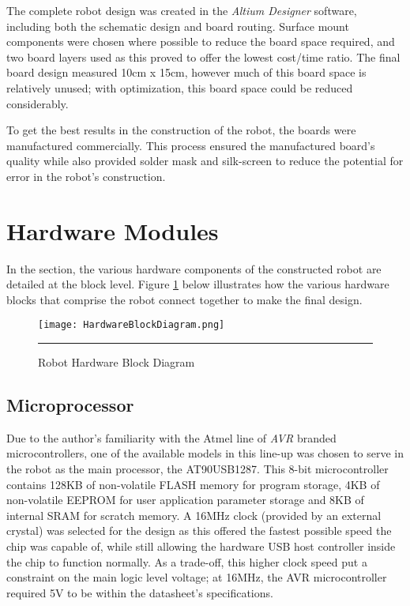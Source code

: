 The complete robot design was created in the \textit{Altium Designer} software, including both the schematic design and board routing. Surface mount components were chosen where possible to reduce the board space required, and two board layers used as this proved to offer the lowest cost/time ratio. The final board design measured 10cm x 15cm, however much of this board space is relatively unused; with optimization, this board space could be reduced considerably.

To get the best results in the construction of the robot, the boards were manufactured commercially. This process ensured the manufactured board's quality while also provided solder mask and silk-screen to reduce the potential for error in the robot's construction.

\section{Hardware Modules}

In the section, the various hardware components of the constructed robot are detailed at the block level. Figure \ref{fig:robotblockhw} below illustrates how the various hardware blocks that comprise the robot connect together to make the final design.

\begin{figure}[H]
	\vspace{1em}
	\centering
		\texttt{[image: HardwareBlockDiagram.png]}
	\rule{35em}{0.5pt}
	\caption[Hardware Block Diagram]{Robot Hardware Block Diagram}
	\label{fig:robotblockhw}
\end{figure}

\FloatBarrier
\subsection{Microprocessor}

Due to the author's familiarity with the Atmel line of \textit{AVR} branded microcontrollers, one of the available models in this line-up was chosen to serve in the robot as the main processor, the AT90USB1287. This 8-bit microcontroller contains 128KB of non-volatile FLASH memory for program storage, 4KB of non-volatile EEPROM for user application parameter storage and 8KB of internal SRAM for scratch memory. A 16MHz clock (provided by an external crystal) was selected for the design as this offered the fastest possible speed the chip was capable of, while still allowing the hardware USB host controller inside the chip to function normally. As a trade-off, this higher clock speed put a constraint on the main logic level voltage; at 16MHz, the AVR microcontroller required 5V to be within the datasheet's specifications.

